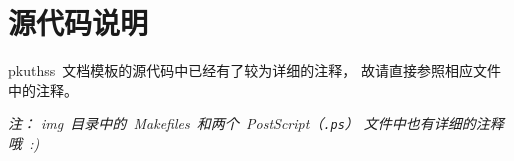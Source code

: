 \chapter{源代码说明}

pkuthss~文档模板的源代码中已经有了较为详细的注释，
故请直接参照相应文件中的注释。

\emph
{%
	注：%
	img~目录中的~Makefiles~和两个~PostScript（\texttt{.ps}）%
	文件中也有详细的注释哦~:)
}

